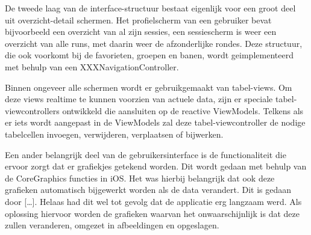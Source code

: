De tweede laag van de interface-structuur bestaat eigenlijk voor een groot deel uit overzicht-detail schermen. Het profielscherm van een gebruiker bevat bijvoorbeeld een overzicht van al zijn sessies, een sessiescherm is weer een overzicht van alle runs, met daarin weer de afzonderlijke rondes. Deze structuur, die ook voorkomt bij de favorieten, groepen en banen, wordt geimplementeerd met behulp van een XXXNavigationController.

Binnen ongeveer alle schermen wordt er gebruikgemaakt van tabel-views. Om deze views realtime te kunnen voorzien van actuele data, zijn er speciale tabel-viewcontrollers ontwikkeld die aansluiten op de reactive ViewModels. Telkens als er iets wordt aangepast in de ViewModels zal deze tabel-viewcontroller de nodige tabelcellen invoegen, verwijderen, verplaatsen of bijwerken.

Een ander belangrijk deel van de gebruikersinterface is de functionaliteit die ervoor zorgt dat er grafiekjes getekend worden. Dit wordt gedaan met behulp van de CoreGraphics functies in iOS. Het was hierbij belangrijk dat ook deze grafieken automatisch bijgewerkt worden als de data verandert. Dit is gedaan door […]. Helaas had dit wel tot gevolg dat de applicatie erg langzaam werd. Als oplossing hiervoor worden de grafieken waarvan het onwaarschijnlijk is dat deze zullen veranderen, omgezet in afbeeldingen en opgeslagen.